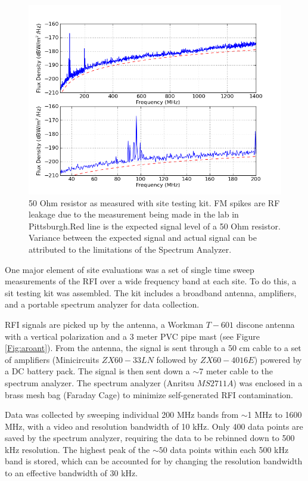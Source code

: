 \begin{figure}[htb]
\begin{center}
\includegraphics[width=0.9\linewidth]{RFI_testing/figures/50Ohm_cal.png}
\caption{50 Ohm resistor as measured with site testing kit. FM spikes are RF leakage due to the measurement being made in the lab in Pittsburgh.Red line is the expected signal level of a 50 Ohm resistor. Variance between the expected signal and actual signal can be attributed to the limitations of the Spectrum Analyzer.}
\label{Fig:resflux}
\end{center}
\end{figure}

One major element of site evaluations was a set of single time sweep measurements of the RFI over a wide frequency band at each site. To do this, a sit testing kit was assembled. The kit includes a broadband antenna, amplifiers, and a portable spectrum analyzer for data collection. 

RFI signals are picked up by the antenna, a Workman $T-601$ discone antenna with a vertical polarization and a 3 meter PVC pipe mast (see Figure \ref{Fig:aroant}). From the antenna, the signal is sent through a 50 cm cable to a set of amplifiers (Minicircuits $ZX60-33LN$ followed by $ZX60-4016E$) powered by a DC battery pack. The signal is then sent down a $\sim$7 meter cable to the spectrum analyzer. The spectrum analyzer (Anritsu $MS2711A$) was enclosed in a brass mesh bag (Faraday Cage) to minimize self-generated RFI contamination. 

Data was collected by sweeping individual 200 MHz bands from $\sim$1 MHz to 1600 MHz, with a video and resolution bandwidth of 10 kHz. Only 400 data points are saved by the spectrum analyzer, requiring the data to be rebinned down to 500 kHz resolution. The highest peak of the $\sim50$ data points within each 500 kHz band is stored, which can be accounted for by changing the resolution bandwidth to an effective bandwidth of 30 kHz. 

